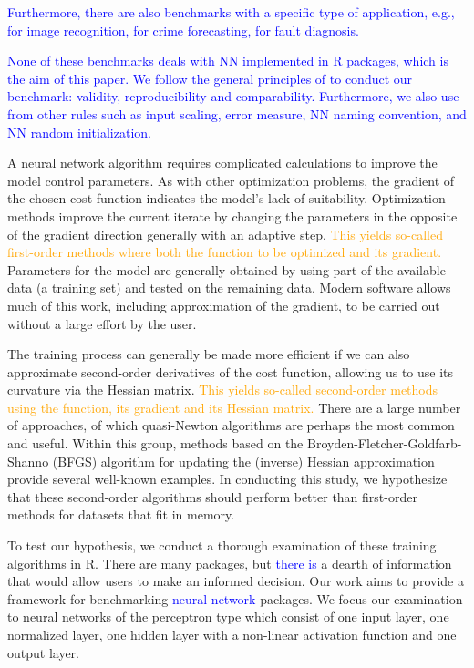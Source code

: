 \textcolor{blue}{Furthermore, there are also benchmarks 
with a specific type of application,
e.g., \citep{bianco2018benchmark} for image recognition,
\citep{WANG2020105120} for crime forecasting,
\citep{witczak2006gmdh} for fault diagnosis.
}

\textcolor{blue}{None of these benchmarks deals with NN 
implemented in \textsf{R} packages, which
is the aim of this paper. 
We follow the general principles of \citep{prechelt1994set}
to conduct our benchmark: validity, reproducibility and
comparability.
Furthermore,  we also use from \citep{prechelt1994set} 
other rules such as input scaling, error measure, 
NN naming convention, and NN random initialization.
}

A neural network algorithm requires complicated calculations to improve
the model control parameters. As with other optimization problems, the
gradient of the chosen cost function indicates the model's lack of
suitability. Optimization methods improve the current iterate by
changing the parameters in the opposite of the gradient direction
generally with an adaptive step.
\textcolor{orange}{This yields so-called first-order methods 
where both the function to be optimized and its gradient.} Parameters
for the model are generally obtained by using part of the available data
(a training set) and tested on the remaining data. Modern software
allows much of this work, including approximation of the gradient, to be
carried out without a large effort by the user.

The training process can generally be made more efficient if we can also
approximate second-order derivatives of the cost function, allowing us
to use its curvature via the Hessian matrix.
\textcolor{orange}{This yields so-called second-order methods 
using the function, its gradient and its Hessian matrix.} There are a
large number of approaches, of which quasi-Newton algorithms are perhaps
the most common and useful. Within this group, methods based on the
Broyden-Fletcher-Goldfarb-Shanno (BFGS) algorithm for updating the
(inverse) Hessian approximation provide several well-known examples. In
conducting this study, we hypothesize that these second-order algorithms
should perform better than first-order methods for datasets that fit in
memory.

To test our hypothesis, we conduct a thorough examination of these
training algorithms in \textsf{R}. There are many packages, but
\textcolor{blue}{there is} a dearth of information that would allow
users to make an informed decision. Our work aims to provide a framework
for benchmarking \textcolor{blue}{neural network} packages. We focus our
examination to neural networks of the perceptron type which consist of
one input layer, one normalized layer, one hidden layer with a
non-linear activation function and one output layer.

